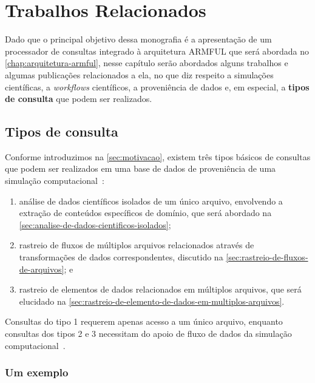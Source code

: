 
\chapter{Trabalhos Relacionados}%
\label{chap:trabalhos-relacionados}

Dado que o principal objetivo dessa monografia é a apresentação de um processador de consultas integrado à arquitetura ARMFUL que será abordada no \autoref{chap:arquitetura-armful}, nesse capítulo serão abordados alguns trabalhos e algumas publicações relacionados a ela, no que diz respeito a simulações científicas, a \textit{workflows} científicos, a proveniência de dados e, em especial, a \textbf{tipos de consulta} que podem ser realizados.

\section{Tipos de consulta}%
\label{sec:tipos-de-consulta}

Conforme introduzimos na \autoref{sec:motivacao}, existem três tipos básicos de consultas que podem ser realizados em uma base de dados de proveniência de uma simulação computacional~\cite{silva2015analyzing,silva2015propostadoutorado}:

\begin{enumerate}
    \item análise de dados científicos isolados de um único arquivo, envolvendo a extração de conteúdos específicos de domínio, que será abordado na \autoref{sec:analise-de-dados-cientificos-isolados};
    \item rastreio de fluxos de múltiplos arquivos relacionados através de transformações de dados correspondentes, discutido na \autoref{sec:rastreio-de-fluxos-de-arquivos}; e
    \item rastreio de elementos de dados relacionados em múltiplos arquivos, que será elucidado na \autoref{sec:rastreio-de-elemento-de-dados-em-multiplos-arquivos}.
\end{enumerate}

Consultas do tipo 1 requerem apenas acesso a um único arquivo, enquanto consultas dos tipos 2 e 3 necessitam do apoio de fluxo de dados da simulação computacional~\cite{silva2015analyzing}.

\subsection{Um exemplo}


